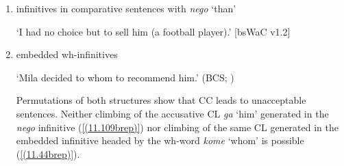 \begin{enumerate}
\item infinitives in comparative sentences with \textit{nego} ‘than’

\begin{exe}\ex
\begin{xlist}
\end{xlist}
\glt ‘I had no choice but to sell him (a football player).’
\hfill [bsWaC v1.2]
\end{exe}

\item embedded wh-infinitives

\begin{exe}\ex
\begin{xlist}
\end{xlist} 
\glt ‘Mila decided to whom to recommend him.’
\hfill (BCS; \citealt[][8]{Aljovic05})
\end{exe}

\noindent Permutations of both structures show that CC leads to unacceptable sentences. Neither climbing of the accusative CL \textit{ga} ‘him’ generated in the \textit{nego} infinitive (\ref{(11.109brep)}) nor climbing of the same CL generated in the embedded infinitive headed by the wh-word \textit{kome} ‘whom’ is possible (\ref{(11.44brep)}). 


\end{enumerate}
